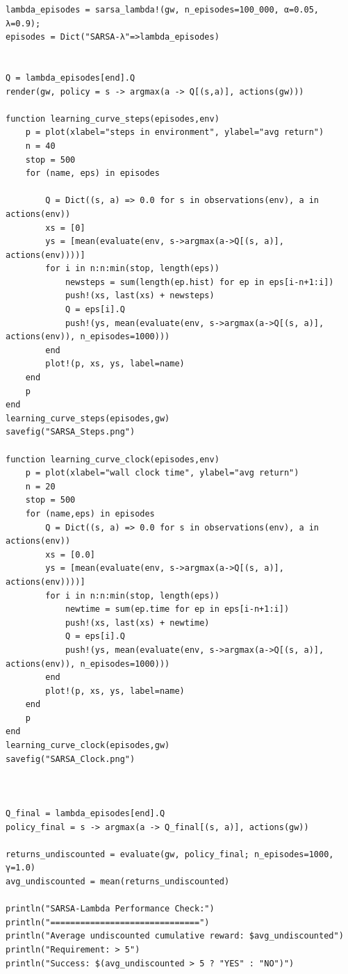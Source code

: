 \documentclass[11pt]{article}
\begin{document}
\begin{lstlisting}
lambda_episodes = sarsa_lambda!(gw, n_episodes=100_000, α=0.05, λ=0.9);
episodes = Dict("SARSA-λ"=>lambda_episodes)


Q = lambda_episodes[end].Q
render(gw, policy = s -> argmax(a -> Q[(s,a)], actions(gw)))

function learning_curve_steps(episodes,env)
	p = plot(xlabel="steps in environment", ylabel="avg return")
	n = 40
	stop = 500
	for (name, eps) in episodes
		  
	    Q = Dict((s, a) => 0.0 for s in observations(env), a in actions(env))
	    xs = [0]
	    ys = [mean(evaluate(env, s->argmax(a->Q[(s, a)], actions(env))))]
	    for i in n:n:min(stop, length(eps))
	        newsteps = sum(length(ep.hist) for ep in eps[i-n+1:i])
	        push!(xs, last(xs) + newsteps)
	        Q = eps[i].Q
	        push!(ys, mean(evaluate(env, s->argmax(a->Q[(s, a)], actions(env)), n_episodes=1000)))
	    end    
	    plot!(p, xs, ys, label=name)
	end
	p
end
learning_curve_steps(episodes,gw)
savefig("SARSA_Steps.png")

function learning_curve_clock(episodes,env)
	p = plot(xlabel="wall clock time", ylabel="avg return")
	n = 20
	stop = 500
	for (name,eps) in episodes
	    Q = Dict((s, a) => 0.0 for s in observations(env), a in actions(env))
	    xs = [0.0]
	    ys = [mean(evaluate(env, s->argmax(a->Q[(s, a)], actions(env))))]
	    for i in n:n:min(stop, length(eps))
	        newtime = sum(ep.time for ep in eps[i-n+1:i])
	        push!(xs, last(xs) + newtime)
	        Q = eps[i].Q
	        push!(ys, mean(evaluate(env, s->argmax(a->Q[(s, a)], actions(env)), n_episodes=1000)))
	    end    
	    plot!(p, xs, ys, label=name)
	end
	p
end
learning_curve_clock(episodes,gw)
savefig("SARSA_Clock.png")



Q_final = lambda_episodes[end].Q
policy_final = s -> argmax(a -> Q_final[(s, a)], actions(gw))

returns_undiscounted = evaluate(gw, policy_final; n_episodes=1000, γ=1.0)
avg_undiscounted = mean(returns_undiscounted)

println("SARSA-Lambda Performance Check:")
println("==============================")
println("Average undiscounted cumulative reward: $avg_undiscounted")
println("Requirement: > 5")
println("Success: $(avg_undiscounted > 5 ? "YES" : "NO")")


\end{lstlisting}
\end{document}
